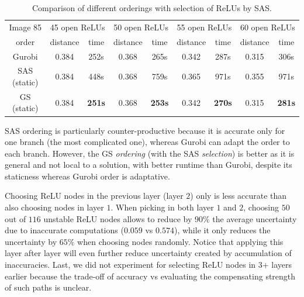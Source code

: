 \begin{table}[t!]	
	\centering
	\begin{tabular}{|c||c c|c c|c c|c c|}
		\hline
		  Image 85& \multicolumn{2}{c|}{45 open ReLUs} & \multicolumn{2}{c|}{50 open ReLUs} 
		  & \multicolumn{2}{c|}{55 open ReLUs} & \multicolumn{2}{c|}{60 open ReLUs}\\ 
		 order & distance & time & distance & time & distance & time & distance & time \\
		\hline \hline
		Gurobi & 0.384 & 252s & 0.368&265s  &0.342 & 287s& 0.315  & 306s  \\ 
		{\sf SAS} (static) & 0.384 & 448s & 0.368&759s  &0.365 &971s & 0.355  & 971s \\
		{\sf GS} (static) & 0.384 & {\bf 251s} &0.368 &{\bf 253s}  & 0.342 &{\bf 270s} & 0.315 & {\bf 281s} \\ \hline
	\end{tabular}
	\caption{Comparison of different orderings with selection of ReLUs by {\sf SAS}.
	\vspace{-0.4cm}}
	\label{table.order}
\end{table}

{\sf SAS} ordering is particularly counter-productive because it is accurate only for one branch (the most complicated one), whereas Gurobi can adapt the order to each branch.
However, the GS {\em ordering} (with the {\sf SAS} {\em selection}) is better as it is general and not local to a solution, with better runtime than Gurobi, despite its staticness whereas Gurobi order is adaptative.

\iffalse
Choosing ReLU nodes in the previous layer (layer $2$) only is less accurate than 
also choosing nodes in layer $1$. When picking in both layer $1$ and $2$, choosing $50$ out of $116$ unstable ReLU nodes allows to reduce by $90\%$ the average uncertainty due to inaccurate computations ($0.059$ vs $0.574$), while it only reduces the uncertainty by $65\%$ when choosing nodes randomly. Notice that applying this layer after layer will even further reduce uncertainty created by accumulation of inaccuracies. 
Last, we did not experiment for selecting ReLU nodes in 3+ layers earlier because the trade-off of accuracy vs evaluating the compensating strength of such paths is unclear.

